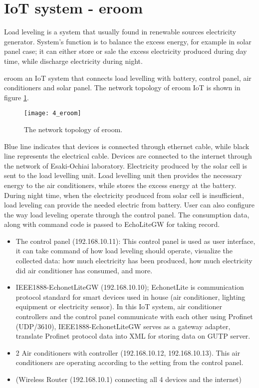 \section{IoT system - eroom} 

Load leveling is a system that usually found in renewable sources electricity generator. System’s function is to balance the excess energy, for example in solar panel case; it can either store or sale the excess electricity produced during day time, while discharge electricity during night.

eroom an IoT system that connects load levelling with battery, control panel, air conditioners and solar panel. The network topology of eroom IoT is shown in figure \ref{fig:s4_eroom}. 

\begin{figure}

    \centering  
    \texttt{[image: 4\_eroom]} 
    \caption{\small The network topology of eroom.} 
    \label{fig:s4_eroom} 
\end{figure}  

Blue line indicates that devices is connected through ethernet cable, while black line represents the electrical cable. 
Devices are connected to the internet through the network of Esaki-Ochiai laboratory. 
Electricity produced by the solar cell is sent to the load levelling unit. 
Load levelling unit then provides the necessary energy to the air conditioners,
while stores the excess energy at the battery. 
During night time, when the electricity produced from solar cell is insufficient, 
load leveling can provide the needed electric from battery. 
User can also configure the way load leveling operate through the control panel. 
The consumption data, along with command code is passed to EchoLiteGW for taking record. 

\begin{itemize}[itemsep=0mm] 
    \item The control panel (192.168.10.11): This control panel is used as user interface, it can take command of how load leveling should operate, visualize the collected data: how much electricity has been produced, how much electricity did air conditioner has consumed, and more. 
    \item IEEE1888-EchonetLiteGW (192.168.10.10); EchonetLite is communication protocol standard for smart devices used in house (air conditioner, lighting equipment or electricity sensor). In this IoT system, air conditioner controllers and the control panel communicate with each other using Profinet (UDP/3610), IEEE1888-EchonetLiteGW serves as a gateway adapter, translate Profinet protocol data into XML for storing data on GUTP server.  
    \item 2 Air conditioners with controller (192.168.10.12, 192.168.10.13). This air conditioners are operating according to the setting from the control panel. 
    \item (Wireless Router (192.168.10.1) connecting all 4 devices and the internet) 
\end{itemize} 